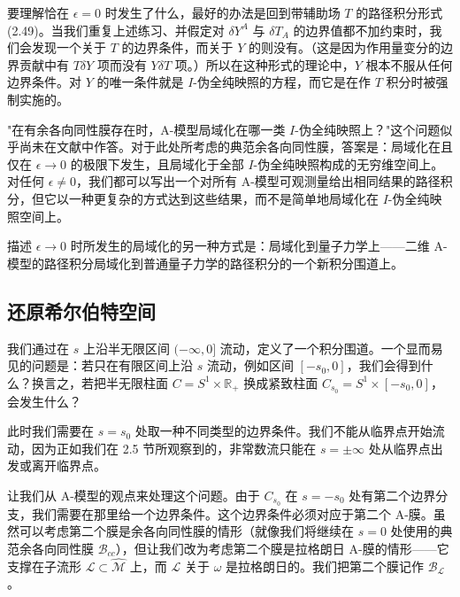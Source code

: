 \documentclass[11pt,a4paper,UTF8]{ctexart}
\theoremstyle{plain}
\theoremstyle{definition}
\begin{document}

要理解恰在 $\epsilon=0$ 时发生了什么，最好的办法是回到带辅助场 $T$ 的路径积分形式 (2.49)。当我们重复上述练习、并假定对 $\delta Y^A$ 与 $\delta T_A$ 的边界值都不加约束时，我们会发现一个关于 $T$ 的边界条件，而关于 $Y$ 的则没有。（这是因为作用量变分的边界贡献中有 $T\delta Y$ 项而没有 $Y\delta T$ 项。）所以在这种形式的理论中，$Y$ 根本不服从任何边界条件。对 $Y$ 的唯一条件就是 $I$-伪全纯映照的方程，而它是在作 $T$ 积分时被强制实施的。

"在有余各向同性膜存在时，A-模型局域化在哪一类 $I$-伪全纯映照上？"这个问题似乎尚未在文献中作答。对于此处所考虑的典范余各向同性膜，答案是：局域化在且仅在 $\epsilon\to0$ 的极限下发生，且局域化于全部 $I$-伪全纯映照构成的无穷维空间上。对任何 $\epsilon\neq0$，我们都可以写出一个对所有 A-模型可观测量给出相同结果的路径积分，但它以一种更复杂的方式达到这些结果，而不是简单地局域化在 $I$-伪全纯映照空间上。

描述 $\epsilon\to0$ 时所发生的局域化的另一种方式是：局域化到量子力学上——二维 A-模型的路径积分局域化到普通量子力学的路径积分的一个新积分围道上。

\subsection{还原希尔伯特空间}

我们通过在 $s$ 上沿半无限区间 $(-\infty,0]$ 流动，定义了一个积分围道。一个显而易见的问题是：若只在有限区间上沿 $s$ 流动，例如区间 $[-s_0,0]$，我们会得到什么？换言之，若把半无限柱面 $C=S^1\times\mathbb{R}_+$ 换成紧致柱面 $C_{s_0}=S^1\times[-s_0,0]$，会发生什么？

此时我们需要在 $s=s_0$ 处取一种不同类型的边界条件。我们不能从临界点开始流动，因为正如我们在 2.5 节所观察到的，非常数流只能在 $s=\pm\infty$ 处从临界点出发或离开临界点。

让我们从 A-模型的观点来处理这个问题。由于 $C_{s_0}$ 在 $s=-s_0$ 处有第二个边界分支，我们需要在那里给一个边界条件。这个边界条件必须对应于第二个 A-膜。虽然可以考虑第二个膜是余各向同性膜的情形（就像我们将继续在 $s=0$ 处使用的典范余各向同性膜 $\mathcal{B}_{cc}$），但让我们改为考虑第二个膜是拉格朗日 A-膜的情形——它支撑在子流形 $\mathcal{L}\subset\widehat{\mathcal{M}}$ 上，而 $\mathcal{L}$ 关于 $\omega$ 是拉格朗日的。我们把第二个膜记作 $\mathcal{B}_{\mathcal{L}}$。
\end{document}
